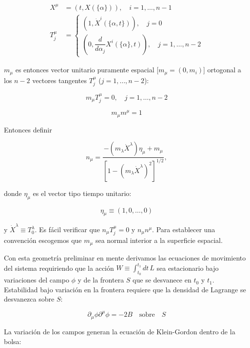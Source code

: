 \begin{equation}
\begin{array}{rl}
{X}^{\mu}  &= (t, X(\{ \alpha \})), \quad i = 1, \dots, n-1 \\
{T}_{j}^{\mu} & =\left\{
\begin{array}{c}
(1,\dot{X}^{i}(\{\alpha, t\})), \quad j=0\\
\left(0, \dfrac{d}{d{\alpha}_{j}} {X}^{i} (\{ \alpha \}, t)\right), \quad j =1,\dots,n-2
\end{array}
\right.
\end{array}
\end{equation}

${m}_{\mu}$ es entonces vector unitario puramente espacial [${m}_{\mu} = (0, {m}_{i})$] ortogonal a los $n - 2$ vectores tangentes ${T}_{j}^{\mu}$ ($j = 1, \dots, n - 2$):

\[
{m}_{\mu} {T}_{j}^{\mu} = 0, \quad j =1, \dots, n - 2
\]

\[
{m}_{\mu} {m}^{\mu} = 1
\]

Entonces definir

\begin{equation}
{n}_{\mu} = \frac{-({m}_{\lambda} \dot{X}^{\lambda}) {\eta}_{\mu} + {m}_{\mu}}{[1 - ({m}_{\lambda} \dot{X}^{\lambda})^{2}]^{1/2}},
\end{equation}

donde ${\eta}_{\mu}$ es el vector tipo tiempo unitario:

\[
{\eta}_{\mu} \equiv (1, 0, \dots, 0)
\]

y $\dot{X}^{\lambda} \equiv {T}_{0}^{\lambda}$. Es fácil verificar que ${n}_{\mu} {T}_{j}^{\mu} = 0$ y ${n}_{\mu}{n}^{\mu}$. Para establecer una convención escogemos que ${m}_{\mu}$ sea normal interior a la superficie espacial.

Con esta geometría preliminar en mente derivamos las ecuaciones de movimiento del sistema requiriendo que la acción $W \equiv \int_{{t}_{0}}^{{t}_{1}} dt \, L$ sea estacionario bajo variaciones del campo $\phi$ y de la frontera $S$ que se desvanece en ${t}_{0}$ y ${t}_{1}$. Estabilidad bajo variación en la frontera requiere que la densidad de Lagrange se desvanezca sobre $S$:

\begin{equation}
{\partial}_{\mu} {\phi} {\partial}^{\mu} {\phi} = - 2B \quad \mathrm{sobre} \quad S
\end{equation}

La variación de los campos generan la ecuación de Klein-Gordon dentro de la bolsa:

